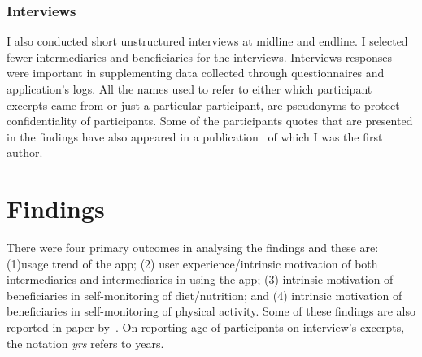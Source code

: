 \subsubsection{Interviews}
I also conducted short unstructured interviews at midline and endline. I selected fewer intermediaries and beneficiaries for the interviews. Interviews responses were important in supplementing data collected through questionnaires and application's logs. All the names used to refer to either which participant excerpts came from or just a particular participant, are pseudonyms to protect confidentiality of participants. Some of the participants quotes that are presented in the findings have also appeared in a publication~\citep{katule2016family} of which I was the first author. 
\section{Findings}
There were four primary outcomes in analysing the findings and these are: (1)usage trend of the app; (2) user experience/intrinsic motivation  of both intermediaries and intermediaries in using the app; (3) intrinsic motivation of beneficiaries in self-monitoring of diet/nutrition; and (4) intrinsic motivation of beneficiaries in self-monitoring of physical activity. Some of these findings are also reported in paper by~\citep{katule2016family}. On reporting age of participants on interview's excerpts, the notation \emph{yrs} refers to years. 
